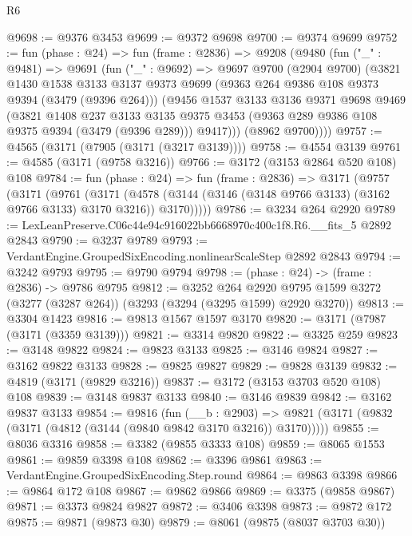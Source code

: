 \begin{lexlean}{R6}
\begin{coremodule}
@9698 := @9376 @3453
@9699 := @9372 @9698
@9700 := @9374 @9699
@9752 := fun (phase : @24) =>
  fun (frame : @2836) =>
  @9208
    (@9480
      (fun ("_" : @9481) =>
      @9691
        (fun ("_" : @9692) =>
        @9697
          @9700
          (@2904 @9700)
          (@3821
            @1430
            @1538
            @3133
            @3137
            @9373
            @9699
            (@9363 @264 @9386 @108 @9373 @9394 (@3479 (@9396 @264)))
            (@9456
              @1537
              @3133
              @3136
              @9371
              @9698
              @9469
              (@3821
                @1408
                @237
                @3133
                @3135
                @9375
                @3453
                (@9363 @289 @9386 @108 @9375 @9394 (@3479 (@9396 @289)))
                @9417)))
          (@8962 @9700))))
@9757 := @4565 (@3171 (@7905 (@3171 (@3217 @3139))))
@9758 := @4554 @3139
@9761 := @4585 (@3171 (@9758 @3216))
@9766 := @3172 (@3153 @2864 @520 @108) @108
@9784 := fun (phase : @24) =>
  fun (frame : @2836) =>
  @3171
    (@9757
      (@3171
        (@9761
          (@3171
            (@4578 (@3144 (@3146 (@3148 @9766 @3133) (@3162 @9766 @3133) @3170 @3216)) @3170)))))
@9786 := @3234 @264 @2920
@9789 := LexLeanPreserve.C06c44e94c916022bb6668970c400c1f8.R6.__fits_5 @2892 @2843
@9790 := @3237 @9789
@9793 := VerdantEngine.GroupedSixEncoding.nonlinearScaleStep @2892 @2843
@9794 := @3242 @9793
@9795 := @9790 @9794
@9798 := (phase : @24) -> (frame : @2836) -> @9786 @9795
@9812 := @3252
    @264
    @2920
    @9795
    @1599
    @3272
    (@3277 (@3287 @264))
    (@3293 (@3294 (@3295 @1599) @2920 @3270))
@9813 := @3304 @1423
@9816 := @9813 @1567 @1597 @3170
@9820 := @3171 (@7987 (@3171 (@3359 @3139)))
@9821 := @3314 @9820
@9822 := @3325 @259
@9823 := @3148 @9822
@9824 := @9823 @3133
@9825 := @3146 @9824
@9827 := @3162 @9822 @3133
@9828 := @9825 @9827
@9829 := @9828 @3139
@9832 := @4819 (@3171 (@9829 @3216))
@9837 := @3172 (@3153 @3703 @520 @108) @108
@9839 := @3148 @9837 @3133
@9840 := @3146 @9839
@9842 := @3162 @9837 @3133
@9854 := @9816
    (fun (__b : @2903) =>
    @9821 (@3171 (@9832 (@3171 (@4812 (@3144 (@9840 @9842 @3170 @3216)) @3170)))))
@9855 := @8036 @3316
@9858 := @3382 (@9855 @3333 @108)
@9859 := @8065 @1553
@9861 := @9859 @3398 @108
@9862 := @3396 @9861
@9863 := VerdantEngine.GroupedSixEncoding.Step.round
@9864 := @9863 @3398
@9866 := @9864 @172 @108
@9867 := @9862 @9866
@9869 := @3375 (@9858 @9867)
@9871 := @3373 @9824 @9827
@9872 := @3406 @3398
@9873 := @9872 @172
@9875 := @9871 (@9873 @30)
@9879 := @8061 (@9875 (@8037 @3703 @30))

\end{coremodule}
\end{lexlean}
